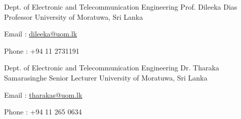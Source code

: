 


\begin{cventries}


\cventry
{Dept. of Electronic and Telecommunication Engineering} %
{Prof. Dileeka Dias} %
{Professor} %
{University of Moratuwa, Sri Lanka} %
{ %
\begin{cvitems}
\item {Email : \href{mailto:dileeka@uom.lk}{dileeka@uom.lk}}
\item {Phone : +94 11 2731191}
\end{cvitems}
}




\cventry
{Dept. of Electronic and Telecommunication Engineering} %
{Dr. Tharaka Samarasinghe} %
{Senior Lecturer} %
{University of Moratuwa, Sri Lanka} %
{ %
\begin{cvitems}
\item {Email : \href{mailto:tharakas@uom.lk}{tharakas@uom.lk}}
\item {Phone : +94 11 265 0634}
\end{cvitems}
}


\end{cventries}